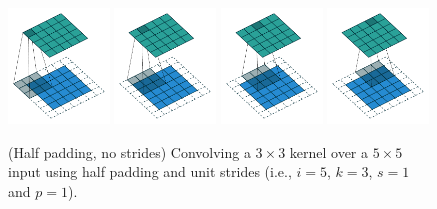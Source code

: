 \documentclass[notitlepage]{report}
\begin{document}
\begin{figure}[p]
    \centering
    \includegraphics[width=0.24\textwidth]{pdf/same_padding_no_strides_00.pdf}
    \includegraphics[width=0.24\textwidth]{pdf/same_padding_no_strides_01.pdf}
    \includegraphics[width=0.24\textwidth]{pdf/same_padding_no_strides_02.pdf}
    \includegraphics[width=0.24\textwidth]{pdf/same_padding_no_strides_03.pdf}
    \caption{\label{fig:same_padding_no_strides} (Half padding, no strides)
        Convolving a $3 \times 3$ kernel over a $5 \times 5$ input using half
        padding and unit strides (i.e., $i = 5$, $k = 3$, $s = 1$ and $p = 1$).}
\end{figure}
\end{document}
